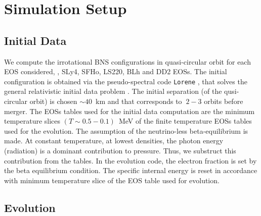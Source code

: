 \chapter{Simulation Setup} \label{app:whisky}%


\section{Initial Data}


We compute the irrotational \ac{BNS} configurations in quasi-circular orbit for 
each \ac{EOS} considered, \eg, SLy4, SFHo, LS220, BLh and DD2 \acp{EOS}.
The initial configuration is obtained via the pseudo-spectral code \texttt{Lorene} \citep{Gourgoulhon:2000nn}, 
that solves the general relativistic initial data problem .
The initial separation (of the qusi-circular orbit) is chosen $\sim40$~km and that
 corresponds to $~2-3$ orbits before merger.
%
The \acp{EOS} tables used for the initial data computation are the minimum temperature slices
$(T\sim 0.5 - 0.1)$~MeV of the finite temperature \acp{EOS} tables used for the evolution.
The assumption of the neutrino-less beta-equilibrium is made.
At constant temperature, at lowest densities, the photon energy (radiation) is a dominant 
contribution to pressure. Thus, we substruct this contribution from the tables.
%
In the evolution code, the electron fraction is set by the beta equilibrium condition. 
The specific internal energy is reset in accordance with minimum 
temperature slice of the \ac{EOS} table used for evolution.






\section{Evolution}

